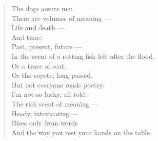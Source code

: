 \begin{verse}
  The dogs assure me:\\
  There are volumes of meaning ---\\
  Life and death ---\\
  And time;\\
  Past, present, future ---\\
  In the scent of a rotting fish left after the flood,\\
  Or a trace of scat,\\
  Or the coyote, long passed,\\
  But not everyone reads poetry.\\

  \vspace{1pc}
  I'm not so lucky, all told:\\
  The rich scent of meaning ---\\
  Heady, intoxicating ---\\
  Rises only from words\\
  And the way you rest your hands on the table.
\end{verse}
